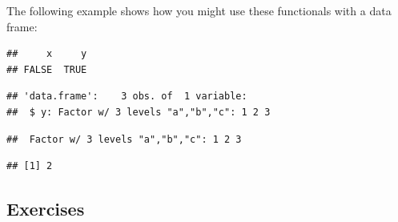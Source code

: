 The following example shows how you might use these functionals with a
data frame:

\begin{Shaded}
\begin{Highlighting}[]
\StringTok{ }\NormalTok{(} \OperatorTok{:}\NormalTok{, } \NormalTok{(}\NormalTok{, }\NormalTok{, }\NormalTok{))}
\end{Highlighting}
\end{Shaded}

\begin{verbatim}
##     x     y 
## FALSE  TRUE
\end{verbatim}

\begin{Shaded}
\begin{Highlighting}[]
\NormalTok{(}
\end{Highlighting}
\end{Shaded}

\begin{verbatim}
## 'data.frame':    3 obs. of  1 variable:
##  $ y: Factor w/ 3 levels "a","b","c": 1 2 3
\end{verbatim}

\begin{Shaded}
\begin{Highlighting}[]
\NormalTok{(}
\end{Highlighting}
\end{Shaded}

\begin{verbatim}
##  Factor w/ 3 levels "a","b","c": 1 2 3
\end{verbatim}

\begin{Shaded}
\begin{Highlighting}[]
\end{Highlighting}
\end{Shaded}

\begin{verbatim}
## [1] 2
\end{verbatim}

\hypertarget{exercises-3}{%
\subsection{Exercises}\label{exercises-3}}

